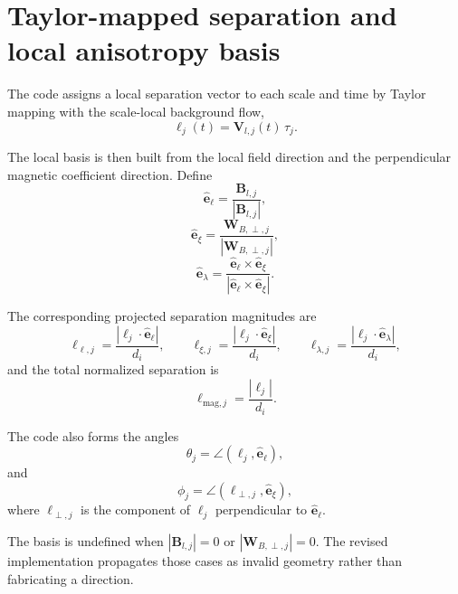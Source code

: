 \documentclass[11pt]{article}
\begin{document}
\section{Taylor-mapped separation and local anisotropy basis}

The code assigns a local separation vector to each scale and time by Taylor mapping with the scale-local background flow,
\begin{equation}
 \bm{\ell}_j(t) = \mathbf{V}_{l,j}(t) \, \tau_j.
\end{equation}

The local basis is then built from the local field direction and the perpendicular magnetic coefficient direction. Define
\begin{equation}
 \hat{\mathbf{e}}_{\ell} = \frac{\mathbf{B}_{l,j}}{|\mathbf{B}_{l,j}|},
\end{equation}
\begin{equation}
 \hat{\mathbf{e}}_{\xi} = \frac{\mathbf{W}_{B,\perp,j}}{|\mathbf{W}_{B,\perp,j}|},
\end{equation}
\begin{equation}
 \hat{\mathbf{e}}_{\lambda} = \frac{\hat{\mathbf{e}}_{\ell} \times \hat{\mathbf{e}}_{\xi}}{|\hat{\mathbf{e}}_{\ell} \times \hat{\mathbf{e}}_{\xi}|}.
\end{equation}

The corresponding projected separation magnitudes are
\begin{equation}
 \ell_{\ell,j} = \frac{|\bm{\ell}_j \cdot \hat{\mathbf{e}}_{\ell}|}{d_i}, \qquad
 \ell_{\xi,j} = \frac{|\bm{\ell}_j \cdot \hat{\mathbf{e}}_{\xi}|}{d_i}, \qquad
 \ell_{\lambda,j} = \frac{|\bm{\ell}_j \cdot \hat{\mathbf{e}}_{\lambda}|}{d_i},
\end{equation}
and the total normalized separation is
\begin{equation}
 \ell_{\mathrm{mag},j} = \frac{|\bm{\ell}_j|}{d_i}.
\end{equation}

The code also forms the angles
\begin{equation}
 \theta_j = \angle(\bm{\ell}_j, \hat{\mathbf{e}}_{\ell}),
\end{equation}
and
\begin{equation}
 \phi_j = \angle(\bm{\ell}_{\perp,j}, \hat{\mathbf{e}}_{\xi}),
\end{equation}
where $\bm{\ell}_{\perp,j}$ is the component of $\bm{\ell}_j$ perpendicular to $\hat{\mathbf{e}}_{\ell}$.

The basis is undefined when $|\mathbf{B}_{l,j}| = 0$ or $|\mathbf{W}_{B,\perp,j}| = 0$. The revised implementation propagates those cases as invalid geometry rather than fabricating a direction.
\end{document}
